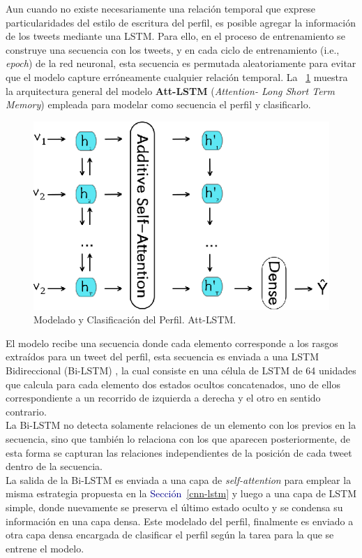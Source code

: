 	Aun cuando no existe necesariamente una relación temporal que exprese particularidades del estilo de escritura del perfil, es posible agregar la información de los tweets mediante una LSTM. Para ello, en el proceso de entrenamiento se construye una secuencia con los tweets, y en cada ciclo de entrenamiento (i.e., \textit{epoch}) de la red neuronal, esta secuencia es permutada aleatoriamente para evitar que el modelo capture erróneamente cualquier relación temporal. La \figurename~\ref{att_lstm} muestra la arquitectura general del modelo \textbf{Att-LSTM} (\textit{Attention- Long Short Term Memory}) empleada para modelar como secuencia el perfil y clasificarlo.
	
	\begin{figure}[!thb]
		\begin{center}
			\includegraphics[]{images/att_lstm.eps}
		\end{center}	
		\caption[Att - LSTM]{Modelado y Clasificación del Perfil. Att-LSTM.}
		\label{att_lstm}
	\end{figure}
	
	El modelo recibe una secuencia donde cada elemento corresponde a los rasgos extraídos para un tweet del perfil, esta secuencia es enviada a una LSTM Bidireccional (Bi-LSTM) \citep{DBLP:journals/tsp/SchusterP97}, la cual consiste en una célula de LSTM de 64 unidades que calcula para cada elemento dos estados ocultos concatenados, uno de ellos correspondiente a un recorrido de izquierda a derecha y el otro en sentido contrario.
	\\
	La Bi-LSTM no detecta solamente relaciones de un elemento con los previos en la secuencia, sino que también lo relaciona con los que aparecen posteriormente, de esta forma se capturan las relaciones independientes de la posición de cada tweet dentro de la secuencia.
	\\ 
	La salida de la Bi-LSTM es enviada a una capa de \textit{self-attention} para emplear la misma estrategia propuesta en la \textcolor{darkblue}{Sección~\ref{cnn-lstm}} y luego a una capa de LSTM simple, donde nuevamente se preserva el último estado oculto y se condensa su información en una capa densa. Este modelado del perfil, finalmente es enviado a otra capa densa encargada de clasificar el perfil según la tarea para la que se entrene el modelo.
	
